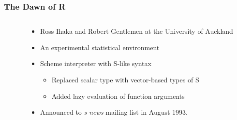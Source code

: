 \documentclass[svgnames, aspectratio=169]{beamer}
\begin{document}
\begin{frame}
  \frametitle{The Dawn of R}

  \begin{columns}
    \begin{column}{2.5cm}
    \end{column}
    \begin{column}{10.5cm}
      \begin{itemize}
      \item Ross Ihaka and Robert Gentlemen at the University of Auckland
      \item An experimental statistical environment
      \item Scheme interpreter with S-like syntax
        \begin{itemize}
        \item Replaced scalar type with vector-based types of S
        \item Added lazy evaluation of function arguments
        \end{itemize}
      \item Announced to {\em s-news} mailing list in August 1993.
      \end{itemize}
    \end{column}
  \end{columns}

\end{frame}
\end{document}
